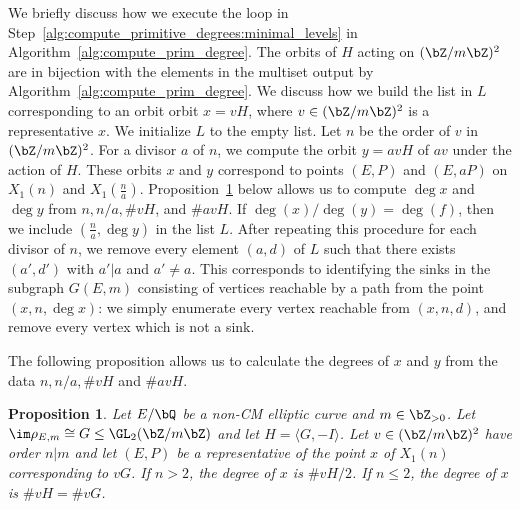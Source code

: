 \documentclass[11pt,reqno]{amsart}
\theoremstyle{plain}
\newtheorem{proposition}[theorem]{Proposition}
\theoremstyle{definition}
\newcommand{\Q}{\bQ}
\newcommand{\Z}{\bZ}
\begin{document}
We briefly discuss how we execute the loop in Step~\ref{alg:compute_primitive_degrees:minimal_levels} in Algorithm~\ref{alg:compute_prim_degree}. The orbits of $H$ acting on $(\Z/m\Z)^2$ are in bijection with the elements in the multiset output by Algorithm~\ref{alg:compute_prim_degree}. We discuss how we build the list in $L$ corresponding to an orbit orbit $x=vH$, where $v\in (\Z/m\Z)^2$ is a representative $x$. We initialize $L$ to the empty list. Let $n$ be the order of $v$ in $(\Z/m\Z)^2$. For a divisor $a$ of $n$, we compute the orbit $y=avH$ of $av$ under the action of $H$. These orbits $x$ and $y$ correspond to points $(E,P)$ and $(E,aP)$ on $X_1(n)$ and $X_1(\frac{n}{a})$. Proposition~\ref{prop:compute_degrees} below allows us to compute $\deg x$ and $\deg y$ from $n,n/a,\#vH$, and $\#avH$.  If  $\deg(x)/\deg(y)=\deg(f)$, then we include $(\frac{n}{a},\deg y)$  in the list $L$.
After repeating this procedure for each divisor of $n$,  we remove every element $( a,d)$ of $L$ such that there exists $( a',d') $ with $a'|a$ and $a'\not=a$. This corresponds to identifying the
sinks in the subgraph $G(E,m)$ consisting of vertices reachable by a path from the point $(x,n,\deg x)$: we simply enumerate every vertex reachable from $(x,n,d)$, and remove every vertex which is not a sink.

The following proposition allows us to calculate the degrees of $x$ and $y$ from the data $n,n/a,\#vH$ and $\#avH$.

\begin{proposition}\label{prop:compute_degrees}
Let $E/\Q$ be a non-CM elliptic curve and $m \in \Z_{>0}$. Let $\im \rho_{E,m} \cong G \leq \GL_2(\Z/m\Z)$ and let $H=\langle G,-I\rangle$. Let $v\in (\Z/m\Z)^2$ have order $n|m$ and let $(E,P)$ be a representative of the point $x$ of $X_1(n)$  corresponding to $vG$. If $n>2$, the degree of $x$ is $\#vH/2$. If $n\leq 2$, the degree of $x$ is
$\#vH=\#vG$.
\end{proposition}
\end{document}
